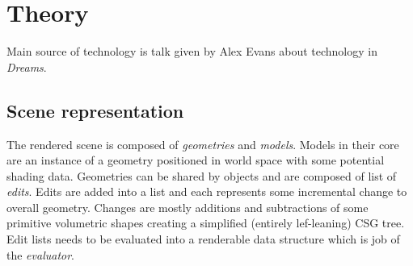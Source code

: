 \documentclass[11pt, a4paper]{article}
\begin{document}

\section{Theory}

Main source of technology is talk given by Alex Evans \cite{evans2015} about technology in \emph{Dreams}{\scriptsize\texttrademark}.

\subsection{Scene representation}

The rendered scene is composed of \emph{geometries} and \emph{models}.
Models in their core are an instance of a geometry positioned in world space with some potential shading data.
Geometries can be shared by objects and are composed of list of \emph{edits}.
Edits are added into a list and each represents some incremental change to overall geometry.
Changes are mostly additions and subtractions of some primitive volumetric shapes creating a simplified (entirely lef-leaning) CSG tree.
Edit lists needs to be evaluated into a renderable data structure which is job of the \emph{evaluator}.
\end{document}
